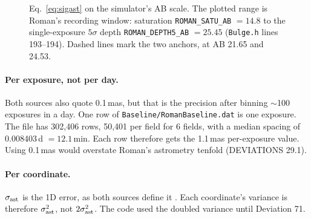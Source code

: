\documentclass[english,10pt,a4paper]{article}
\newcommand{\code}[1]{\texttt{#1}}
\begin{document}
\begin{figure}[h]
\centering
{}
\caption{Eq.~\eqref{eq:sigast} on the simulator's AB scale. The plotted range is Roman's recording
window: saturation \code{ROMAN\_SATU\_AB} $=14.8$ to the single-exposure $5\sigma$ depth
\code{ROMAN\_DEPTH5\_AB} $=25.45$ (\code{Bulge.h} lines 193--194). Dashed lines mark the two
anchors, at AB 21.65 and 24.53.}
\label{fig:curve}
\end{figure}

\paragraph{Per exposure, not per day.}
Both sources also quote 0.1\,mas, but that is the precision after binning $\sim$100 exposures in a
day. One row of \code{Baseline/RomanBaseline.dat} is one exposure. The file has 302{,}406 rows,
50{,}401 per field for 6 fields, with a median spacing of 0.008403\,d $=12.1$\,min. Each row
therefore gets the 1.1\,mas per-exposure value. Using 0.1\,mas would overstate Roman's astrometry
tenfold (DEVIATIONS 29.1).

\paragraph{Per coordinate.}
$\sigma_{\rm ast}$ is the 1D error, as both sources define it \citep[fn.~14]{Lam2026BHbinaries}.
Each coordinate's variance is therefore $\sigma_{\rm ast}^2$, not $2\sigma_{\rm ast}^2$. The code
used the doubled variance until Deviation 71.
\end{document}
